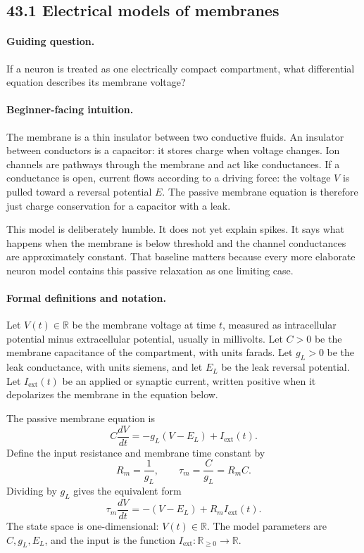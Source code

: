 \subsection{43.1 Electrical models of membranes}

\paragraph{Guiding question.}
If a neuron is treated as one electrically compact compartment, what differential equation describes its membrane voltage?

\paragraph{Beginner-facing intuition.}
The membrane is a thin insulator between two conductive fluids. An insulator between conductors is a capacitor: it stores charge when voltage changes. Ion channels are pathways through the membrane and act like conductances. If a conductance is open, current flows according to a driving force: the voltage \(V\) is pulled toward a reversal potential \(E\). The passive membrane equation is therefore just charge conservation for a capacitor with a leak.

This model is deliberately humble. It does not yet explain spikes. It says what happens when the membrane is below threshold and the channel conductances are approximately constant. That baseline matters because every more elaborate neuron model contains this passive relaxation as one limiting case.

\paragraph{Formal definitions and notation.}
Let \(V(t)\in\mathbb{R}\) be the membrane voltage at time \(t\), measured as intracellular potential minus extracellular potential, usually in millivolts. Let \(C>0\) be the membrane capacitance of the compartment, with units farads. Let \(g_L>0\) be the leak conductance, with units siemens, and let \(E_L\) be the leak reversal potential. Let \(I_{\mathrm{ext}}(t)\) be an applied or synaptic current, written positive when it depolarizes the membrane in the equation below.

The passive membrane equation is
\[
C\frac{dV}{dt}=-g_L(V-E_L)+I_{\mathrm{ext}}(t).
\]
Define the input resistance and membrane time constant by
\[
R_m=\frac{1}{g_L},\qquad \tau_m=\frac{C}{g_L}=R_mC.
\]
Dividing by \(g_L\) gives the equivalent form
\[
\tau_m\frac{dV}{dt}=-(V-E_L)+R_m I_{\mathrm{ext}}(t).
\]
The state space is one-dimensional: \(V(t)\in\mathbb{R}\). The model parameters are \(C,g_L,E_L\), and the input is the function \(I_{\mathrm{ext}}:\mathbb{R}_{\geq0}\to\mathbb{R}\).

